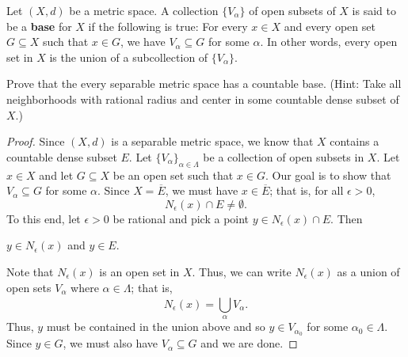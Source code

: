 \documentclass[a4paper]{article}
\begin{document}
   \begin{problem}
       Let \( (X,d) \) be a metric space. A collection \( \{ {V}_{\alpha} \} \) of open subsets of \( X  \) is said to be a \textbf{base} for \( X  \) if the following is true: For every \( x \in X  \) and every open set \( G \subseteq X   \) such that \( x \in G  \), we have \( {V}_{\alpha} \subseteq G   \) for some \( \alpha \). In other words, every open set in \( X  \) is the union of a subcollection of \( \{ {V}_{\alpha} \}  \). 

       Prove that the every separable metric space has a countable base. (Hint: Take all neighborhoods with rational radius and center in some countable dense subset of \( X  \).)
   \end{problem}
   \begin{proof}
   Since \( (X,d) \) is a separable metric space, we know that \( X  \) contains a countable dense subset \( E  \). Let \( \{ {V}_{\alpha} \}_{\alpha \in \Lambda} \) be a collection of open subsets in \( X  \). Let \( x \in X  \) and let \( G \subseteq  X   \) be an open set such that \( x \in G  \). Our goal is to show that \( {V}_{\alpha} \subseteq  G  \) for some \( \alpha \). Since \( X = \overline{E } \), we must have \( x \in \overline{E} \); that is, for all \( \epsilon > 0  \),
   \[  {N}_{\epsilon}(x) \cap E \neq \emptyset. \]
   To this end, let \( \epsilon > 0 \) be rational and pick a point \( y \in {N}_{\epsilon}(x) \cap E  \). Then
   \begin{center}
       \( y \in {N}_{\epsilon}(x) \) and \( y \in E  \).
   \end{center}
    Note that \( {N}_{\epsilon}(x) \) is an open set in \( X  \). Thus, we can write \( {N}_{\epsilon}(x) \) as a union of open sets \( {V}_{\alpha} \) where \( \alpha \in \Lambda \); that is, 
    \[  {N}_{\epsilon}(x) = \bigcup_{ \alpha }^{  } {V}_{\alpha}. \]
    Thus, \( y  \) must be contained in the union above and so \( y \in {V}_{\alpha_0} \) for some \( {\alpha}_{0} \in \Lambda \). Since \( y \in G  \), we must also have \( {V}_{\alpha} \subseteq G  \) and we are done.
   \end{proof}
\end{document}

